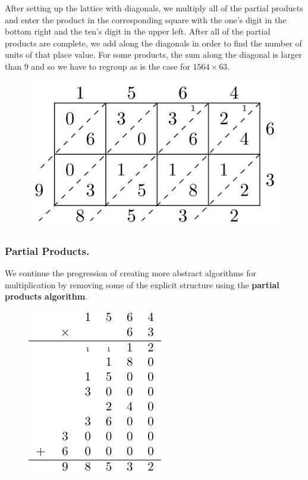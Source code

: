 \documentclass[
]{book}
\theoremstyle{definition}
\theoremstyle{definition}
\theoremstyle{definition}
\theoremstyle{remark}
\begin{document}
After setting up the lattice with diagonals, we multiply all of the partial products and enter the product in the corresponding square with the one's digit in the bottom right and the ten's digit in the upper left. After all of the partial products are complete, we add along the diagonals in order to find the number of units of that place value. For some products, the sum along the diagonal is larger than \(9\) and so we have to regroup as is the case for \(1564 \times 63\).

\begin{figure}

{\centering \includegraphics[width=0.6\linewidth]{tikz/lattice-multiplication-large} 

}

\end{figure}

\hypertarget{partial-products.}{%
\subsubsection*{Partial Products.}\label{partial-products.}}

We continue the progression of creating more abstract algorithms for multiplication by removing some of the explicit structure using the \textbf{partial products algorithm}.

\begin{figure}

{\centering \includegraphics[width=0.6\linewidth]{tikz/partial-products} 

}

\end{figure}
\end{document}
